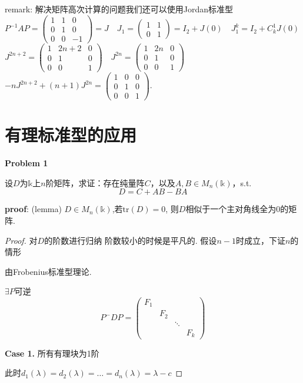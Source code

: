 \begin{enumerate}
remark: 解决矩阵高次计算的问题我们还可以使用Jordan标准型\\
$P^{-1}AP = \begin{pmatrix} 1 & 1 & 0\\0 & 1 & 0\\0 & 0 & -1 \end{pmatrix} = J \quad
J_1 = \begin{pmatrix} 1 & 1 \\ 0 & 1 \end{pmatrix} = I_2 + J(0) \quad
J_1^k = I_2 + C_k^1 J(0)$\\
$J^{2n+2} = \begin{pmatrix} 1 & 2n+2 & 0\\0 & 1 & 0\\0 & 0 & 1 \end{pmatrix} \quad
J^{2n} = \begin{pmatrix} 1 & 2n & 0\\0 & 1 & 0\\0 & 0 & 1 \end{pmatrix}$\\
$-n J^{2n+2} + (n+1) J^{2n} = \begin{pmatrix} 1 & 0 & 0\\0 & 1 & 0\\0 & 0 & 1 \end{pmatrix}.$
\section{有理标准型的应用}
\textbf{Problem 1}

设$D$为$\mathbb{k}$上$n$阶矩阵，求证：存在纯量阵$C$，以及$A,B \in M_n(\mathbb{k})$，s.t.
\[D = C + AB - BA\]

\textbf{proof}: (lemma) $D \in M_n(\mathbb{k})$,若$\mathrm{tr}(D)=0$, 则$D$相似于一个主对角线全为0的矩阵.
\begin{proof}
对$D$的阶数进行归纳
阶数较小的时候是平凡的.
假设$n-1$时成立，下证$n$的情形

由Frobenius标准型理论.

$\exists P$可逆
\[P^-DP = \begin{pmatrix}
F_1 & & & \\
 & F_2 & & \\
 & & \ddots & \\
 & & & F_k
\end{pmatrix}\]

\textbf{Case 1.} 所有有理块为1阶

此时$d_1(\lambda)=d_2(\lambda)=\dots=d_n(\lambda)=\lambda-c$


\end{proof}
\end{enumerate}

